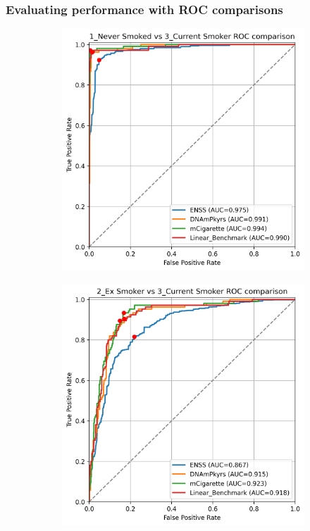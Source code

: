 \documentclass{article} %
\begin{document}
\subsubsection{Evaluating performance with ROC comparisons}
\begin{figure}[htb]
    \centering
    \begin{subfigure}{0.48\linewidth}
        \centering
        \includegraphics[width=\linewidth]{comparison_1v3.png}
    \end{subfigure}
    \hfill
    \begin{subfigure}{0.48\linewidth}
        \centering
        \includegraphics[width=\linewidth]{comparison_2v3.png}

\end{subfigure}
\end{figure}
\end{document}
